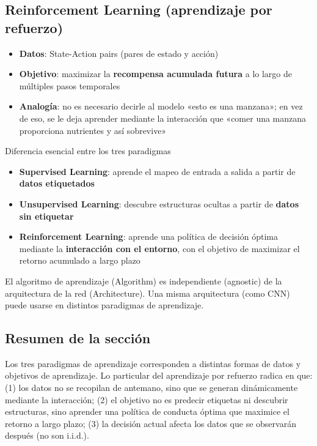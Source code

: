 \subsection{Reinforcement Learning (aprendizaje por refuerzo)}

\begin{itemize}
    \item \textbf{Datos}: State-Action pairs (pares de estado y acción)
    \item \textbf{Objetivo}: maximizar la \textbf{recompensa acumulada futura} a lo largo de múltiples pasos temporales
    \item \textbf{Analogía}: no es necesario decirle al modelo «esto es una manzana»; en vez de eso, se le deja aprender mediante la interacción que «comer una manzana proporciona nutrientes y así sobrevive»
\end{itemize}

\begin{importantbox}{Diferencia esencial entre los tres paradigmas}
\begin{itemize}
    \item \textbf{Supervised Learning}: aprende el mapeo de entrada a salida a partir de \textbf{datos etiquetados}
    \item \textbf{Unsupervised Learning}: descubre estructuras ocultas a partir de \textbf{datos sin etiquetar}
    \item \textbf{Reinforcement Learning}: aprende una política de decisión óptima mediante la \textbf{interacción con el entorno}, con el objetivo de maximizar el retorno acumulado a largo plazo
\end{itemize}
El algoritmo de aprendizaje (Algorithm) es independiente (agnostic) de la arquitectura de la red (Architecture). Una misma arquitectura (como CNN) puede usarse en distintos paradigmas de aprendizaje.
\end{importantbox}

\subsection{Resumen de la sección}
Los tres paradigmas de aprendizaje corresponden a distintas formas de datos y objetivos de aprendizaje. Lo particular del aprendizaje por refuerzo radica en que: (1) los datos no se recopilan de antemano, sino que se generan dinámicamente mediante la interacción; (2) el objetivo no es predecir etiquetas ni descubrir estructuras, sino aprender una política de conducta óptima que maximice el retorno a largo plazo; (3) la decisión actual afecta los datos que se observarán después (no son i.i.d.).


